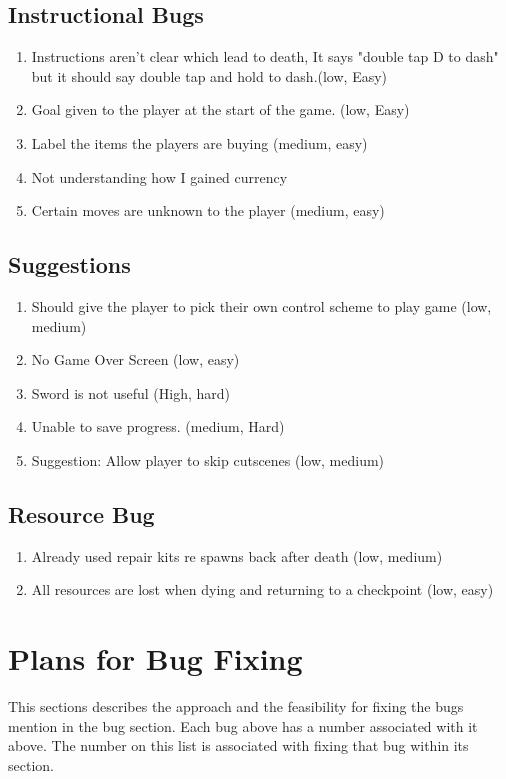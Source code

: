 \documentclass{article}
\begin{document}
\subsection*{Instructional Bugs}
\begin{enumerate}
	\item Instructions aren't clear which lead to death, It says "double tap D to dash" but it should say double tap and hold to dash.(low, Easy)
	\item Goal given to the player at the start of the game.  (low, Easy)
		\item  Label the items the players are buying (medium, easy)
			\item Not understanding how I gained currency
				\item Certain moves are unknown to the player  (medium, easy)
\end{enumerate}
\subsection*{Suggestions}
\begin{enumerate}
	\item  Should give the player to pick their own control scheme to play game (low, medium)
		\item No Game Over Screen (low, easy)
			\item Sword is not useful  (High, hard)
				\item Unable to save progress. (medium, Hard)
					\item Suggestion: Allow player to skip cutscenes (low, medium)
				\end{enumerate} 
\subsection*{Resource Bug}
\begin{enumerate}
	\item Already used repair kits re spawns back after death (low, medium)
	\item All resources are lost when dying and returning to a checkpoint  (low, easy)
\end{enumerate}





\section*{Plans for Bug Fixing}
This sections describes the approach and the feasibility for fixing the bugs mention in the bug section.
Each bug above has a number associated with it above. The number on this list is associated with fixing that bug within its section. 
\end{document}
